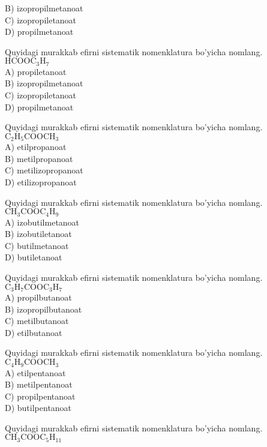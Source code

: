 B) izopropilmetanoat\\
C) izopropiletanoat\\
D) propilmetanoat
  \item Quyidagi murakkab efirni sistematik nomenklatura bo'yicha nomlang.\\
$\mathrm{HCOOC}_{3} \mathrm{H}_{7}$\\
A) propiletanoat\\
B) izopropilmetanoat\\
C) izopropiletanoat\\
D) propilmetanoat
  \item Quyidagi murakkab efirni sistematik nomenklatura bo'yicha nomlang.\\
$\mathrm{C}_{2} \mathrm{H}_{5} \mathrm{COOCH}_{3}$\\
A) etilpropanoat\\
B) metilpropanoat\\
C) metilizopropanoat\\
D) etilizopropanoat
  \item Quyidagi murakkab efirni sistematik nomenklatura bo'yicha nomlang.\\
$\mathrm{CH}_{3} \mathrm{COOC}_{4} \mathrm{H}_{9}$\\
A) izobutilmetanoat\\
B) izobutiletanoat\\
C) butilmetanoat\\
D) butiletanoat
  \item Quyidagi murakkab efirni sistematik nomenklatura bo'yicha nomlang.\\
$\mathrm{C}_{3} \mathrm{H}_{7} \mathrm{COOC}_{3} \mathrm{H}_{7}$\\
A) propilbutanoat\\
B) izopropilbutanoat\\
C) metilbutanoat\\
D) etilbutanoat
  \item Quyidagi murakkab efirni sistematik nomenklatura bo'yicha nomlang.\\
$\mathrm{C}_{4} \mathrm{H}_{9} \mathrm{COOCH}_{3}$\\
A) etilpentanoat\\
B) metilpentanoat\\
C) propilpentanoat\\
D) butilpentanoat
  \item Quyidagi murakkab efirni sistematik nomenklatura bo'yicha nomlang.\\
$\mathrm{CH}_{3} \mathrm{COOC}_{5} \mathrm{H}_{11}$\\
